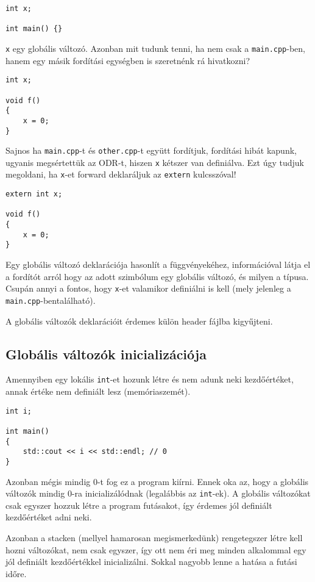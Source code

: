 \documentclass[a4paper,11.5pt,table]{article}
\begin{document}
	\begin{lstlisting}
int x;

int main() {}
	\end{lstlisting}
	\texttt{x} egy globális változó. Azonban mit tudunk tenni, ha nem csak a \texttt{main.cpp}-ben, hanem egy másik fordítási egységben is szeretnénk rá hivatkozni?
	\medskip
	
	\begin{lstlisting}
int x;

void f() 
{
	x = 0;
}
	\end{lstlisting}
  Sajnos ha \texttt{main.cpp}-t és \texttt{other.cpp}-t együtt fordítjuk, fordítási hibát kapunk, ugyanis megsértettük az ODR-t, hiszen \texttt{x} kétszer van definiálva. Ezt úgy tudjuk megoldani, ha \texttt{x}-et forward deklaráljuk az \texttt{extern} kulcsszóval!
	\medskip
	
	\begin{lstlisting}
extern int x;

void f() 
{
	x = 0;
}
	\end{lstlisting}
	Egy globális változó deklarációja hasonlít a függvényekéhez, információval látja el a fordítót arról hogy az adott szimbólum egy globális változó, és milyen a típusa. Csupán annyi a fontos, hogy \texttt{x}-et valamikor definiálni is kell (mely jelenleg a \texttt{main.cpp}-bentalálható).
	\begin{note}
		A globális változók deklarációit érdemes külön header fájlba kigyűjteni.
	\end{note}
	\subsection{Globális változók inicializációja}
	Amennyiben egy lokális \texttt{int}-et hozunk létre és nem adunk neki kezdőértéket, annak értéke nem definiált lesz (memóriaszemét).
	\begin{lstlisting}
int i;

int main() 
{
	std::cout << i << std::endl; // 0
}
	\end{lstlisting}   
	Azonban mégis mindig 0-t fog ez a program kiírni. Ennek oka az, hogy a globális változók mindig 0-ra inicializálódnak (legalábbis az \texttt{int}-ek). A globális változókat csak egyszer hozzuk létre a program futásakot, így érdemes jól definiált kezdőértéket adni neki.
	
	Azonban a stacken (mellyel hamarosan megismerkedünk) rengetegszer létre kell hozni változókat, nem csak egyszer, így ott nem éri meg minden alkalommal egy jól definiált kezdőértékkel inicializálni. Sokkal nagyobb lenne a hatása a futási időre.
	
\end{document}
